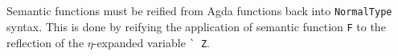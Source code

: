 \documentclass[authoryear, acmsmall, screen, review, nonacm]{acmart}
\begin{document}
\begin{code}%
\>[0]\AgdaSpace{}%
\AgdaSymbol{\{}\AgdaSpace{}%
\AgdaSymbol{=}\AgdaSpace{}%
\AgdaSymbol{\}}\AgdaSpace{}%
\AgdaSpace{}%
\AgdaSymbol{=}\AgdaSpace{}%
\<%
\\
\>[0]\AgdaSpace{}%
\AgdaSymbol{\{}\AgdaSpace{}%
\AgdaSymbol{=}\AgdaSpace{}%
\AgdaSymbol{\}}\AgdaSpace{}%
\AgdaSpace{}%
\AgdaSymbol{=}\AgdaSpace{}%
\<%
\\
\>[0]\AgdaSpace{}%
\AgdaSymbol{\{}\AgdaSpace{}%
\AgdaSymbol{=}\AgdaSpace{}%
\AgdaOperator{\AgdaInductiveConstructor{R[}}\AgdaSpace{}%
\AgdaSpace{}%
\AgdaOperator{\AgdaInductiveConstructor{]}}\AgdaSymbol{\}}\AgdaSpace{}%
\AgdaSymbol{(}\AgdaSpace{}%
\AgdaSymbol{(}\AgdaSpace{}%
\AgdaSymbol{))}\AgdaSpace{}%
\AgdaSymbol{=}\AgdaSpace{}%
\AgdaSpace{}%
\<%
\\
\>[0]\AgdaSpace{}%
\AgdaSymbol{\{}\AgdaSpace{}%
\AgdaSymbol{=}\AgdaSpace{}%
\AgdaOperator{\AgdaInductiveConstructor{R[}}\AgdaSpace{}%
\AgdaSpace{}%
\AgdaOperator{\AgdaInductiveConstructor{]}}\AgdaSymbol{\}}\AgdaSpace{}%
\AgdaSymbol{(}\AgdaSpace{}%
\AgdaSymbol{(}\AgdaSpace{}%
\AgdaSymbol{(}\AgdaSpace{}%
\AgdaOperator{\AgdaInductiveConstructor{,}}\AgdaSpace{}%
\AgdaSymbol{)))}\AgdaSpace{}%
\AgdaSymbol{=}\AgdaSpace{}%
\AgdaSpace{}%
\AgdaSpace{}%
\AgdaSymbol{(}\AgdaSpace{}%
\AgdaSymbol{)}\<%
\\
\>[0]\AgdaSpace{}%
\AgdaSymbol{\{}\AgdaSpace{}%
\AgdaSymbol{=}\AgdaSpace{}%
\AgdaOperator{\AgdaInductiveConstructor{R[}}\AgdaSpace{}%
\AgdaSpace{}%
\AgdaOperator{\AgdaInductiveConstructor{]}}\AgdaSymbol{\}}\AgdaSpace{}%
\AgdaSpace{}%
\AgdaSymbol{=}\AgdaSpace{}%
\<%
\end{code}

Semantic functions must be reified from Agda functions back into \verb!NormalType! syntax. This is done by reifying the application of semantic function \verb!F! to the reflection of the $\eta$-expanded variable \verb!` Z!.
\end{document}
